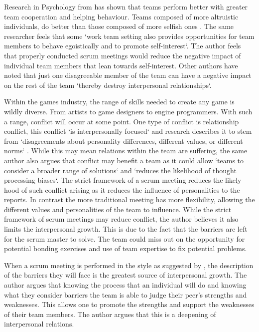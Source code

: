 \documentclass{scrartcl}
\begin{document}
Research in Psychology from \cite{li2014toward} has shown that teams perform better with greater team cooperation and helping behaviour. Teams composed of more altruistic individuals, do better than those composed of more selfish ones \cite[p. 542]{li2014toward}.  The same researcher feels that some `work team setting also provides opportunities for team members to behave egoistically and to promote self-interest`\cite[p. 542]{li2014toward}. The author feels that properly conducted scrum meetings would reduce the negative impact of individual team members that lean towards self-interest. Other authors have noted that just one disagreeable member of the team can have a negative impact on the rest of the team `thereby destroy interpersonal relationships`\cite[p. 381] {barrick1998relating}.

Within the games industry, the range of skills needed to create any game is wildly diverse. From artists to game designers to engine programmers. With such a range, conflict will occur at some point\cite{gorse2007communication}. One type of conflict is relationship conflict, this conflict `is interpersonally focused` \cite [p. 215]{costa2015direct} and research describes it to stem from `disagreements about personality differences, different values, or different norms` \cite [p. 215]{costa2015direct}. While this may mean relations within the team are suffering, the same author also argues that conflict may benefit a team as it could allow `teams to consider a broader range of solutions` and `reduces the likelihood of thought processing biases`\cite [p. 215]{costa2015direct}. The strict framework of a scrum meeting reduces the likely hood of such conflict arising as it reduces the influence of personalities to the reports. In contrast the more traditional meeting \cite{costa2015direct, gorse2007communication}  has more flexibility, allowing the different values and personalities of the team to influence. While the strict framework of scrum meetings may reduce conflict, the author believes it also limits the interpersonal growth. This is due to the fact that the barriers are left for the scrum master to solve. The team could miss out on the opportunity for potential bonding exercises and use of team expertise to fix potential problems.

When a scrum meeting is performed in the style as suggested by \cite{AgileScrum}, the description of the barriers they will face is the greatest source of interpersonal growth. The author argues that knowing the process that an individual will do and knowing what they consider barriers the team is able to judge their peer’s strengths and weaknesses. This allows one to promote the strengths and support the weaknesses of their team members. The author argues that this is a deepening of interpersonal relations.
\end{document}
